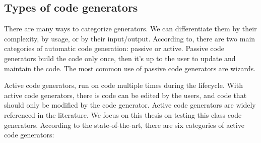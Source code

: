 \subsection{Types of code generators}
There are many ways to categorize generators. We can differentiate them by their complexity, by usage, or by their input/output. According to\cite{herrington2003code}, there are two main categories of automatic code generation: passive or active. Passive code generators build the code only once, then it’s up to the user to update and maintain the code. 
The most common use of passive code generators are wizards. 

Active code generators, run on code multiple times during the lifecycle. With active code generators, there is code can be edited by the users, and code that should only be modified by the code generator. Active code generators are widely referenced in the literature\cite{pais2005tool,amanquah2009rapid}. We focus on this thesis on testing this class code generators.
According to the state-of-the-art\cite{herrington2003code,hunt2000pragmatic,fertalj2008source,bajovs2013code}, there are six categories of active code generators: 


